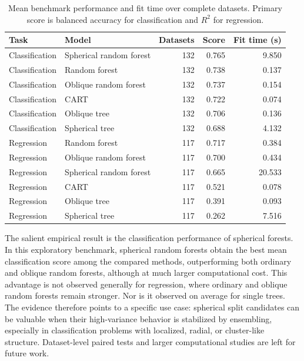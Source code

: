 \documentclass[final,5p,times,twocolumn]{elsarticle}
\begin{document}
\begin{table}[t]
    \centering
    \caption{Mean benchmark performance and fit time over complete datasets.
    Primary score is balanced accuracy for classification and $R^2$ for
    regression.}
    \label{tab:benchmark}
    \begin{tabular}{llrrr}
        \toprule
        Task & Model & Datasets & Score & Fit time (s)\\
        \midrule
        Classification & Spherical random forest & 132 & 0.765 & 9.850\\
        Classification & Random forest & 132 & 0.738 & 0.137\\
        Classification & Oblique random forest & 132 & 0.737 & 0.154\\
        Classification & CART & 132 & 0.722 & 0.074\\
        Classification & Oblique tree & 132 & 0.706 & 0.136\\
        Classification & Spherical tree & 132 & 0.688 & 4.132\\
        \midrule
        Regression & Random forest & 117 & 0.717 & 0.384\\
        Regression & Oblique random forest & 117 & 0.700 & 0.434\\
        Regression & Spherical random forest & 117 & 0.665 & 20.533\\
        Regression & CART & 117 & 0.521 & 0.078\\
        Regression & Oblique tree & 117 & 0.391 & 0.093\\
        Regression & Spherical tree & 117 & 0.262 & 7.516\\
        \bottomrule
    \end{tabular}
\end{table}

The salient empirical result is the classification performance of spherical
forests. In this exploratory benchmark, spherical random forests obtain the
best mean classification score among the compared methods, outperforming both
ordinary and oblique random forests, although at much larger computational
cost. This advantage is not observed generally for regression, where ordinary
and oblique random forests remain stronger. Nor is it observed on average for
single trees. The evidence therefore points to a specific use case: spherical
split candidates can be valuable when their high-variance behavior is
stabilized by ensembling, especially in classification problems with localized,
radial, or cluster-like structure. Dataset-level paired tests and larger
computational studies are left for future work.
\end{document}
